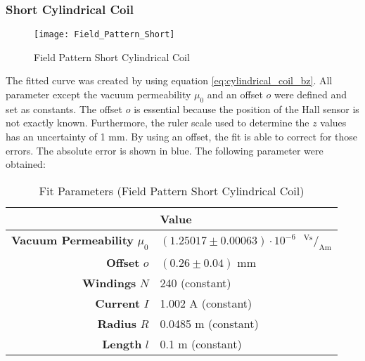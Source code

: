 \subsubsection{Short Cylindrical Coil}
\label{subsubsec:Short_Cylindrical_Coil_Field}
\begin{figure}[H]
	\centering
	\texttt{[image: Field\_Pattern\_Short]}
	\caption{Field Pattern Short Cylindrical Coil}
	\label{fig:Field_Pattern_Short}
\end{figure}
The fitted curve was created by using equation \ref{eq:cylindrical_coil_bz}. All parameter except the vacuum permeability $\mu_0$ and an offset $o$ were defined and set as constants. The offset $o$ is essential because the position of the Hall sensor is not exactly known. Furthermore, the ruler scale used to determine the $z$ values has an uncertainty of 1 mm. By using an offset, the fit is able to correct for those errors. The absolute error is shown in blue. The following parameter were obtained:
\begin{table}[H]
	\centering
	\renewcommand{\arraystretch}{1.3}
	\begin{tabular}{r|l}
		& \textbf{Value} \\
		\hline\hline
		\textbf{Vacuum Permeability} $\mu_0$ & $(1.25017\pm0.00063)\cdot10^{-6}$\ $\,^\text{Vs}\!/_\text{Am}$ \\
		\textbf{Offset} $o$ & $(0.26\pm0.04)$ mm \\
		\textbf{Windings} $N$ & 240 (constant) \\
		\textbf{Current} $I$ & 1.002 A (constant) \\
		\textbf{Radius} $R$ & 0.0485 m (constant) \\
		\textbf{Length} $l$ & 0.1 m (constant) \\
	\end{tabular}
	\caption{Fit Parameters (Field Pattern Short Cylindrical Coil)}
	\label{tab:Field_Pattern_Short}
\end{table}
